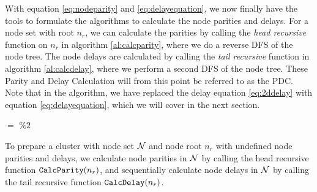 With equation \ref{eq:nodeparity} and \ref{eq:delayequation}, we now finally have the tools to formulate the algorithms to calculate the node parities and delays. For a node set with root $n_r$, we can calculate the parities by calling the \emph{head recursive} function  on $n_r$ in algorithm \ref{al:calcparity}, where we do a reverse DFS of the node tree. The node delays are calculated by calling the \emph{tail recursive} function  in algorithm \ref{al:calcdelay}, where we perform a second DFS of the node tree. These Parity and Delay Calculation will from this point be referred to as the PDC. Note that in the  algorithm, we have replaced the delay equation \ref{eq:2ddelay} with equation \ref{eq:delayequation}, which we will cover in the next section.

\begin{algo}[algotitle=CalcParity, label=al:calcparity]
\begin{algorithm}[H]

\KwData{\node}

\BlankLine

\parity $=$  $\%2$\;
\end{algorithm}
\end{algo}

\begin{algo}[algotitle=CalcDelay, label=al:calcdelay]
\begin{algorithm}[H]

\KwData{\node, \cluster}

\BlankLine

\end{algorithm}
\end{algo}
\begin{theorem}
  To prepare a cluster with node set $\mathcal{N}$ and node root $n_r$ with undefined node parities and delays, we calculate node parities in $\mathcal{N}$ by calling the head recursive function $\texttt{CalcParity}(n_r)$, and sequentially calculate node delays in $\mathcal{N}$ by calling the tail recursive function $\texttt{CalcDelay}(n_r)$.
\end{theorem}


